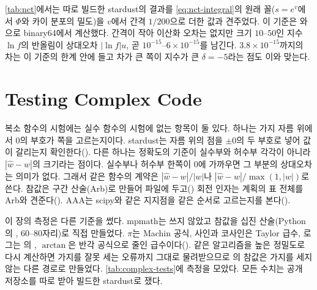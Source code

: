 \cref{tab:nct}에서는 따로 빌드한 stardust의 결과를 \cref{eq:nct-integral}의 원래 꼴($s=e^v$에서 $\Phi$와 카이 분포의 밀도)을 $v$에서 간격 $1/200$으로 더한 값과 견주었다. 이 기준은 와 으로 binary64에서 계산했다. 간격이 작아 이산화 오차는 없지만 크기 $10$--$50$인 지수 $\ln f$의 반올림이 상대오차 $|\ln f|u$, 곧 $10^{-15}$--$6\times10^{-15}$를 남긴다. $3.8\times10^{-15}$까지의 차는 이 기준의 한계 안에 들고 차가 큰 쪽이 지수가 큰 $\delta=-5$라는 점도 이와 맞는다.


\section{Testing Complex Code}
\label{sec:complex-testing}

복소 함수의 시험에는 실수 함수의 시험에 없는 항목이 둘 있다. 하나는 가지 자름 위에서 $0$의 부호가 쪽을 고르는지이다. stardust는 자름 위의 점을 $\pm0$의 두 부호로 넣어 값이 갈리는지 확인한다(). 다른 하나는 정확도의 기준이 실수부와 허수부 각각이 아니라 $|\hat w-w|$의 크기라는 점이다. 실수부나 허수부 한쪽이 $0$에 가까우면 그 부분의 상대오차는 의미가 없다. 그래서  같은 함수의 계약은 $|\hat w-w|/|w|$나 $|\hat w-w|/\max(1,|w|)$로 쓴다. 참값은 구간 산술(Arb)로 만들어 파일에 두고() 회전 인자는 계획의 표 전체를 Arb와 견준다(). AAA는 scipy와 같은 지지점을 같은 순서로 고르는지를 본다().

이 장의 측정은 다른 기준을 썼다. mpmath는 쓰지 않았고 참값을 십진 산술(Python의 , $60$--$80$자리)로 직접 만들었다. $\pi$는 Machin 공식, 사인과 코사인은 Taylor 급수, 로그는 의 , $\arctan$은 반각 공식으로 줄인 급수이다(). 같은 알고리즘을 높은 정밀도로 다시 계산하면 가지를 잘못 세는 오류까지 그대로 물려받으므로 의 참값은 가지를 세지 않는 다른 경로로 만들었다. \cref{tab:complex-tests}에 측정을 모았다. 모든 수치는 공개 저장소를 따로 받아 빌드한 stardust로 쟀다.

